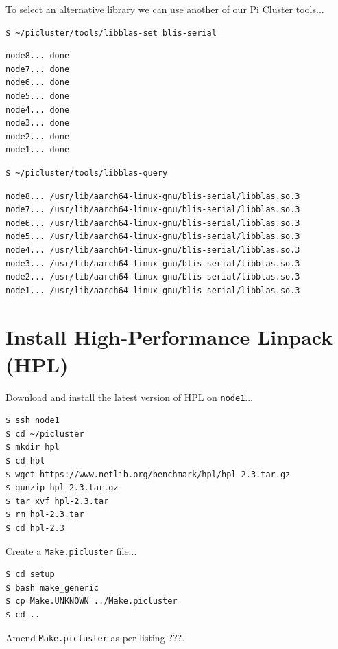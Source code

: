 \documentclass{report}
\begin{document}
To select an alternative library we can use another of our Pi Cluster tools...

\lstset{style=type}
\begin{lstlisting}[]
$ ~/picluster/tools/libblas-set blis-serial
\end{lstlisting}

\lstset{style=type}
\begin{lstlisting}[]
node8... done
node7... done
node6... done 
node5... done 
node4... done 
node3... done 
node2... done 
node1... done 
\end{lstlisting}

\lstset{style=type}
\begin{lstlisting}[]
$ ~/picluster/tools/libblas-query
\end{lstlisting}

\lstset{style=type}
\begin{lstlisting}[]
node8... /usr/lib/aarch64-linux-gnu/blis-serial/libblas.so.3
node7... /usr/lib/aarch64-linux-gnu/blis-serial/libblas.so.3
node6... /usr/lib/aarch64-linux-gnu/blis-serial/libblas.so.3
node5... /usr/lib/aarch64-linux-gnu/blis-serial/libblas.so.3
node4... /usr/lib/aarch64-linux-gnu/blis-serial/libblas.so.3
node3... /usr/lib/aarch64-linux-gnu/blis-serial/libblas.so.3
node2... /usr/lib/aarch64-linux-gnu/blis-serial/libblas.so.3
node1... /usr/lib/aarch64-linux-gnu/blis-serial/libblas.so.3
\end{lstlisting}


%
%
\chapter{Install High-Performance Linpack (HPL)}

Download and install the latest version of HPL on \verb|node1|...

\lstset{style=type}
\begin{lstlisting}
$ ssh node1
$ cd ~/picluster
$ mkdir hpl
$ cd hpl
$ wget https://www.netlib.org/benchmark/hpl/hpl-2.3.tar.gz
$ gunzip hpl-2.3.tar.gz
$ tar xvf hpl-2.3.tar
$ rm hpl-2.3.tar
$ cd hpl-2.3
\end{lstlisting}

Create a \verb|Make.picluster| file...

\lstset{style=type}
\begin{lstlisting}
$ cd setup
$ bash make_generic
$ cp Make.UNKNOWN ../Make.picluster
$ cd ..
\end{lstlisting}

Amend \verb|Make.picluster| as per listing ???.
\end{document}
